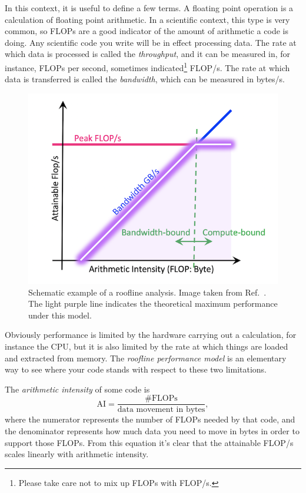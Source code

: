 In this context, it is useful to define a few terms. A floating
point operation is a calculation of floating point arithmetic. In a
scientific context, this type is very common, so FLOPs are a good indicator
of the amount of arithmetic a code is doing. Any scientific code you write will
be in effect processing data. The rate at which data is processed
is called the {\it throughput}, 
and it can be measured in, for instance, FLOPs
per second, sometimes indicated\footnote{Please take care not to
mix up FLOPs with FLOP/s.} FLOP/s. The rate at which data is
transferred is called the {\it bandwidth},
which can be measured in bytes/s.

\begin{figure}[t]
  \centering
  \includegraphics[width=\linewidth]{figs/Roofline-intro.png}
  \caption{Schematic example of a roofline analysis.
           Image taken from Ref.~\cite{roofline}.
           The light purple line indicates the theoretical
           maximum performance under this model.}
  \label{fig:roofline}
\end{figure}

Obviously performance is limited by the hardware carrying out a calculation, for
instance the CPU, but it is also limited by the rate at which things are loaded
and extracted from memory. The {\it roofline performance model} is an elementary
way to see where your code stands with respect to these two limitations.

The {\it arithmetic intensity} of some code is
\begin{equation}
  \text{AI}=\frac{\text{\# FLOPs}}{\text{data movement in bytes}},
\end{equation}
where the numerator represents the number of FLOPs needed by that code, and the
denominator represents how much data you need to move in bytes in order to
support those FLOPs. From this equation it's clear that the attainable
FLOP/s scales linearly with arithmetic intensity.

